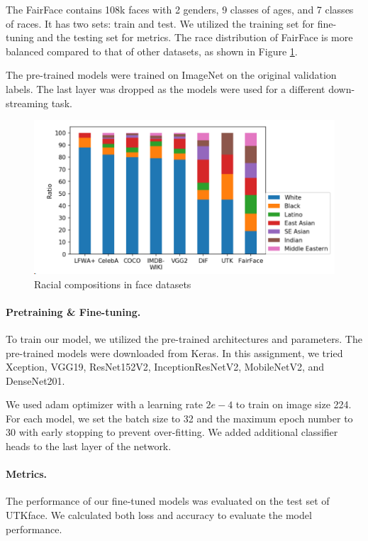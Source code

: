 \documentclass[DIV=calc, paper=a4, fontsize=10pt, twocolumn]{article}
\begin{document}
	The FairFace contains 108k faces with 2 genders, 9 classes of ages, and 7 classes of races. It has two sets: train and test. We utilized the training set for fine-tuning and the testing set for metrics. The race distribution of FairFace is more balanced compared to that of other datasets, as shown in Figure \ref{fig:screenshot002}.
	
	The pre-trained models were trained on ImageNet\cite{ILSVRC15} on the original validation labels. The last layer was dropped as the models were used for a different down-streaming task.
	
	\begin{figure}[H]
		\centering
		\includegraphics[width=1\linewidth]{imgs/screenshot002}
		\caption{Racial compositions in face datasets}
		\label{fig:screenshot002}
	\end{figure}
	
	\paragraph{Pretraining \& Fine-tuning.} To train our model, we utilized the pre-trained architectures and parameters. The pre-trained models were downloaded from Keras. In this assignment, we tried Xception, VGG19, ResNet152V2, InceptionResNetV2, MobileNetV2, and DenseNet201.
	
	We used adam optimizer with a learning rate $ 2e-4 $ to train on image size 224. For each model, we set the batch size to 32 and the maximum epoch number to 30 with early stopping to prevent over-fitting. We added additional classifier heads to the last layer of the network.
	
	\paragraph{Metrics.} The performance of our fine-tuned models was evaluated on the test set of UTKface. We calculated both loss and accuracy to evaluate the model performance.
	
\end{document}

